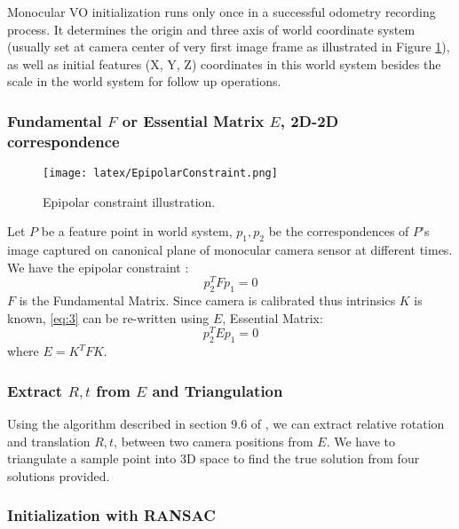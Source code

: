 \documentclass[10pt,twocolumn,letterpaper]{article}
\begin{document}
Monocular VO initialization runs only once in a successful odometry recording process. It determines the origin and three axis of world coordinate system (usually set at camera center of very first image frame as illustrated in Figure \ref{fig:figure3}), as well as initial features (X, Y, Z) coordinates in this world system besides the scale in the world system for follow up operations. 

\subsubsection{Fundamental $F$ or Essential Matrix $E$, 2D-2D correspondence}

\begin{figure}[h]
\texttt{[image: latex/EpipolarConstraint.png]}
\caption{Epipolar constraint illustration.}
\label{fig:figure3}
\end{figure}

Let $P$ be a feature point in world system, $p_1, p_2$ be the correspondences of $P$'s image captured on canonical plane of monocular camera sensor at different times. We have the epipolar constraint \cite{Hartley2004}:
\begin{equation} \label{eq:2}
p_2^T F p_1 = 0
\end{equation}
$F$ is the Fundamental Matrix. Since camera is calibrated thus intrinsics $K$ is known, \ref{eq:3} can be re-written using $E$, Essential Matrix:
\begin{equation} \label{eq:3}
p_2^T E p_1 = 0
\end{equation}
where $E=K^T F K$. 

\subsubsection{Extract $R, t$ from $E$ and Triangulation}

Using the algorithm described in section 9.6 of \cite{Hartley2004}, we can extract relative rotation and translation $R, t$, between two camera positions from $E$. We have to triangulate a sample point into 3D space to find the true solution from four solutions provided. 

\subsubsection{Initialization with RANSAC}
\end{document}
